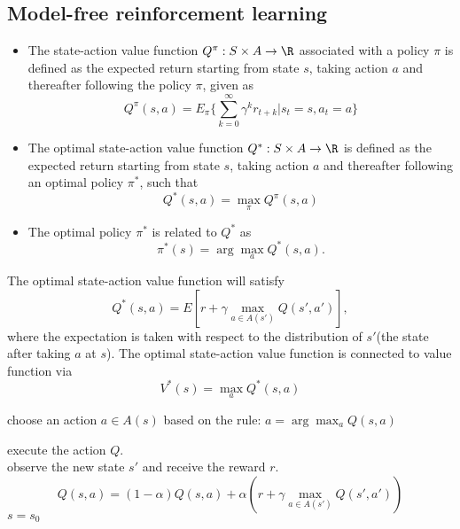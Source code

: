 \begin{refsection}
\section{Model-free reinforcement learning}



\begin{definition}\cite[16]{wiering2012reinforcement}
\begin{itemize}
\item The state-action value function $Q^\pi:S\times A\to \R$ associated with a policy $\pi$ is defined as the expected return starting from state $s$, taking action $a$ and thereafter following the policy $\pi$, given as
		$$Q^\pi(s,a) = E_\pi \{\sum_{k=0}^\infty \gamma^k r_{t+k}|s_t = s,a_t = a\}$$
\item The optimal state-action value function $Q^*:S\times A\to \R$  is defined as the expected return starting from state $s$, taking action $a$ and thereafter following an optimal policy $\pi^*$, such that
$$Q^*(s,a) = \max_{\pi} Q^\pi(s,a) $$
\item The optimal policy $\pi^*$ is related to $Q^*$ as
$$\pi^*(s) = \arg \max_a Q^*(s,a).$$  
\end{itemize}
\end{definition}


\begin{lemma}
The optimal state-action value function will satisfy
		$$Q^*(s,a) = E[r + \gamma \max_{a\in A(s')} Q(s',a')],$$
where the expectation is taken with respect to the distribution of $s'$(the state after taking $a$ at $s$). 
The optimal state-action value function is connected to value function via
		$$V^*(s) = \max_{a} Q^*(s,a)$$	
\end{lemma}



\begin{algorithm}[H]
	\SetAlgoLined
	choose an action $a\in A(s)$ based on the rule:
	$a = \arg\max_a Q(s,a)$
	
	execute the action $Q$.\\
	
	observe the new state $s'$ and receive the reward $r$.\\

	$$Q(s,a) = (1-\alpha) Q(s,a) + \alpha(r + \gamma \max_{a\in A(s')} Q(s',a'))$$
	$s = s_0$
	

\end{algorithm}
\end{refsection}

